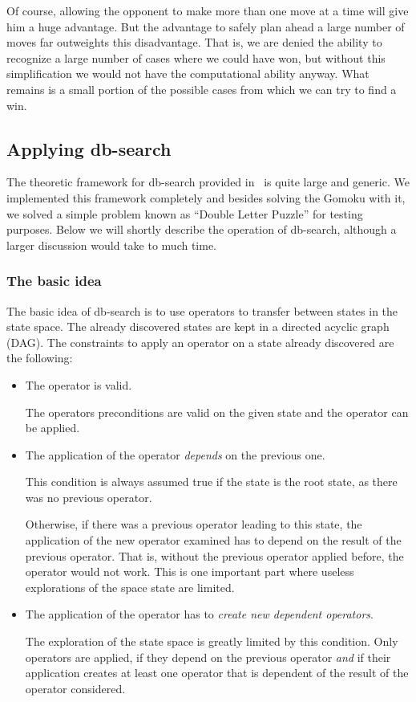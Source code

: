 \documentclass[10pt]{article}
\begin{document}
Of course, allowing the opponent to make more than one move at a time will
give him a huge advantage.  But the advantage to safely plan ahead a large
number of moves far outweights this disadvantage.  That is, we are denied the
ability to recognize a large number of cases where we could have won, but
without this simplification we would not have the computational ability
anyway.  What remains is a small portion of the possible cases from which we
can try to find a win.

\subsection{Applying db-search}

The theoretic framework for db-search provided in~\cite{Allis92} is quite
large and generic.  We implemented this framework completely and besides
solving the Gomoku with it, we solved a simple problem known as ``Double
Letter Puzzle'' for testing purposes.  Below we will shortly describe the
operation of db-search, although a larger discussion would take to much time.

\subsubsection{The basic idea}

The basic idea of db-search is to use operators to transfer between states in
the state space.  The already discovered states are kept in a directed acyclic
graph (DAG).  The constraints to apply an operator on a state already
discovered are the following:
\begin{itemize}
\item The operator is valid.

The operators preconditions are valid on the given state and the operator
can be applied.
\item The application of the operator {\em depends} on the previous one.

This condition is always assumed true if the state is the root state, as there
was no previous operator.

Otherwise, if there was a previous operator leading to this state, the
application of the new operator examined has to depend on the result of the
previous operator.  That is, without the previous operator applied before, the
operator would not work.  This is one important part where useless
explorations of the space state are limited.
\item The application of the operator has to {\em create new dependent
operators}.

The exploration of the state space is greatly limited by this condition.  Only
operators are applied, if they depend on the previous operator {\em and} if
their application creates at least one operator that is dependent of the
result of the operator considered.
\end{itemize}
\end{document}
